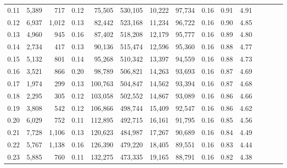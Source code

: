 \begin{tabular}{rrrcrrrrrrrrrrr}
0.11 &   5,389 &    717 &                                       0.12 &   75,505 &  530,105 &   10,222 &   97,734 &  0.16 &  0.91 &                         4.91 \\
0.12 &   6,937 &  1,012 &                                       0.13 &   82,442 &  523,168 &   11,234 &   96,722 &  0.16 &  0.90 &                         4.85 \\
0.13 &   4,960 &    945 &                                       0.16 &   87,402 &  518,208 &   12,179 &   95,777 &  0.16 &  0.89 &                         4.80 \\
0.14 &   2,734 &    417 &                                       0.13 &   90,136 &  515,474 &   12,596 &   95,360 &  0.16 &  0.88 &                         4.77 \\
0.15 &   5,132 &    801 &                                       0.14 &   95,268 &  510,342 &   13,397 &   94,559 &  0.16 &  0.88 &                         4.73 \\
0.16 &   3,521 &    866 &                                       0.20 &   98,789 &  506,821 &   14,263 &   93,693 &  0.16 &  0.87 &                         4.69 \\
0.17 &   1,974 &    299 &                                       0.13 &  100,763 &  504,847 &   14,562 &   93,394 &  0.16 &  0.87 &                         4.68 \\
0.18 &   2,295 &    305 &                                       0.12 &  103,058 &  502,552 &   14,867 &   93,089 &  0.16 &  0.86 &                         4.66 \\
0.19 &   3,808 &    542 &                                       0.12 &  106,866 &  498,744 &   15,409 &   92,547 &  0.16 &  0.86 &                         4.62 \\
0.20 &   6,029 &    752 &                                       0.11 &  112,895 &  492,715 &   16,161 &   91,795 &  0.16 &  0.85 &                         4.56 \\
0.21 &   7,728 &  1,106 &                                       0.13 &  120,623 &  484,987 &   17,267 &   90,689 &  0.16 &  0.84 &                         4.49 \\
0.22 &   5,767 &  1,138 &                                       0.16 &  126,390 &  479,220 &   18,405 &   89,551 &  0.16 &  0.83 &                         4.44 \\
0.23 &   5,885 &    760 &                                       0.11 &  132,275 &  473,335 &   19,165 &   88,791 &  0.16 &  0.82 &                         4.38 \\

\end{tabular}
